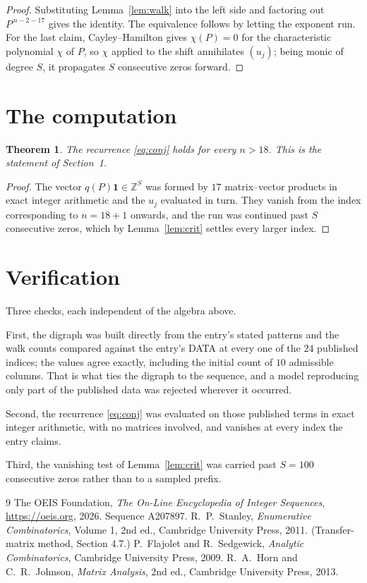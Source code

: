 \documentclass[11pt,a4paper]{article}
\theoremstyle{plain}
\newtheorem{theorem}{Theorem}
\theoremstyle{definition}
\begin{document}
\begin{proof}
Substituting Lemma~\ref{lem:walk} into the left side and factoring out
$P^{\,n-2-17}$ gives the identity. The equivalence follows by letting the exponent
run. For the last claim, Cayley--Hamilton gives $\chi(P)=0$ for the characteristic
polynomial $\chi$ of $P$, so $\chi$ applied to the shift annihilates $(u_j)$; being monic of
degree $S$, it propagates $S$ consecutive zeros forward.
\end{proof}

\section{The computation}

\begin{theorem}
The recurrence \eqref{eq:conj} holds for every $n>18$. This is the statement of
Section~1.
\end{theorem}

\begin{proof}
The vector $q(P)\mathbf{1}\in\mathbb{Z}^{S}$ was formed by $17$ matrix--vector
products in exact integer arithmetic and the $u_j$ evaluated in turn. They vanish from the
index corresponding to $n=18+1$ onwards, and the run was continued past $S$ consecutive
zeros, which by Lemma~\ref{lem:crit} settles every larger index.
\end{proof}

\section{Verification}

Three checks, each independent of the algebra above.

First, the digraph was built directly from the entry's stated patterns and the walk counts
compared against the entry's DATA at every one of the $24$ published indices; the
values agree exactly, including the initial count of $10$ admissible columns. That is
what ties the digraph to the sequence, and a model reproducing only part of the published
data was rejected wherever it occurred.

Second, the recurrence \eqref{eq:conj} was evaluated on those published terms in exact
integer arithmetic, with no matrices involved, and vanishes at every index the entry claims.

Third, the vanishing test of Lemma~\ref{lem:crit} was carried past $S=100$ consecutive
zeros rather than to a sampled prefix.

\begin{thebibliography}{9}
 The OEIS Foundation, \emph{The On-Line Encyclopedia of Integer
Sequences}, \url{https://oeis.org}, 2026. Sequence A207897.
 R.~P.~Stanley, \emph{Enumerative Combinatorics}, Volume 1, 2nd ed.,
Cambridge University Press, 2011. (Transfer-matrix method, Section 4.7.)
 P.~Flajolet and R.~Sedgewick, \emph{Analytic Combinatorics}, Cambridge
University Press, 2009.
 R.~A.~Horn and C.~R.~Johnson, \emph{Matrix Analysis}, 2nd ed., Cambridge
University Press, 2013.
\end{thebibliography}
\end{document}

